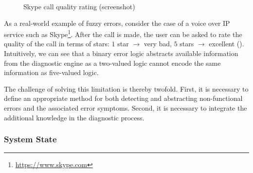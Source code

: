 \begin{figure}[!ht]
  \caption{Skype call quality rating (screenshot)}
  \label{fig:intro:fuzzy-skype}
\end{figure}

As a real-world example of fuzzy errors, consider the case of a voice
over IP service such as Skype\footnote{\url{https://www.skype.com}}.
%
After the call is made, the user can be asked to rate the quality of
the call in terms of stars: $1$ star $\rightarrow$ very bad, $5$ stars
$\rightarrow$ excellent ().
%
Intuitively, we can see that a binary error logic abstracts available
information from the diagnostic engine as a two-valued logic cannot
encode the same information as five-valued logic.

The challenge of solving this limitation is thereby twofold.
%
First, it is necessary to define an appropriate method for both
detecting and abstracting non-functional errors and the associated
error symptoms.
%
Second, it is necessary to integrate the additional knowledge in the
diagnostic process.

%
\subsubsection{System State}
\label{sec:intro:research-goals:system-state}

